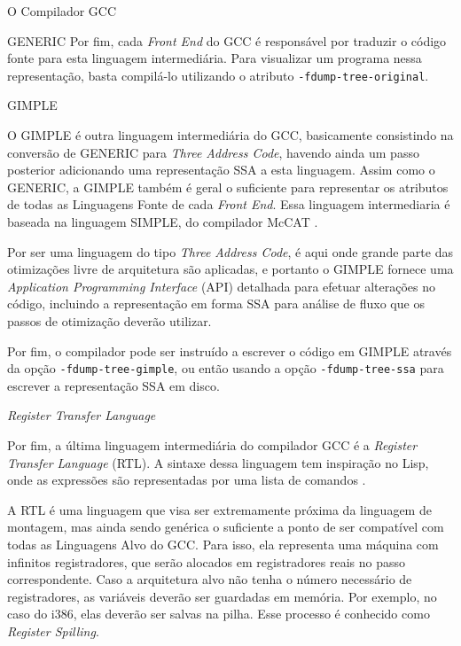 \begin{section}{O Compilador GCC}
\begin{subsection}{GENERIC}
    Por fim, cada \textit{Front End} do GCC é responsável por traduzir o
código fonte para esta linguagem intermediária. Para visualizar um programa
nessa representação, basta compilá-lo utilizando o atributo
\texttt{-fdump-tree-original}.

\end{subsection}

\begin{subsection}{GIMPLE}

O GIMPLE é outra linguagem intermediária do GCC, basicamente consistindo na
conversão de GENERIC para \textit{Three Address Code}, havendo ainda um passo
posterior adicionando uma representação SSA a esta linguagem. Assim como o
GENERIC, a GIMPLE também é geral o suficiente para representar os atributos
de todas as Linguagens Fonte de cada \textit{Front End}.  Essa linguagem
intermediaria é baseada na linguagem SIMPLE, do compilador McCAT \citep{gimple}.

    Por ser uma linguagem do tipo \textit{Three Address Code}, é aqui onde
grande parte das otimizações livre de arquitetura são aplicadas, e portanto o
GIMPLE fornece uma \textit{Application Programming Interface} (API) detalhada
para efetuar alterações no código, incluindo a representação em forma SSA para análise
de fluxo que os passos de otimização deverão utilizar.

    Por fim, o compilador pode ser instruído a escrever o código em
GIMPLE através da opção \texttt{-fdump-tree-gimple}, ou então usando
a opção \texttt{-fdump-tree-ssa} para escrever a representação SSA
em disco.

\end{subsection}

\begin{subsection}{\textit{Register Transfer Language}}

    Por fim, a última linguagem intermediária do compilador GCC é a
\textit{Register Transfer Language} (RTL). A sintaxe dessa linguagem
tem inspiração no Lisp, onde as expressões são representadas por uma
lista de comandos \citep{rtl}.

    A RTL é uma linguagem que visa ser extremamente próxima da linguagem
de montagem, mas ainda sendo genérica o suficiente a ponto de ser compatível
com todas as Linguagens Alvo do GCC.
Para isso, ela representa uma máquina com infinitos
registradores, que serão alocados em registradores reais no passo correspondente.
Caso a arquitetura alvo não tenha o número necessário de
registradores, as variáveis deverão ser guardadas em memória. Por exemplo,
no caso do i386, elas deverão ser salvas na pilha. Esse processo é conhecido
como \textit{Register Spilling}.


\end{subsection}
\end{section}
